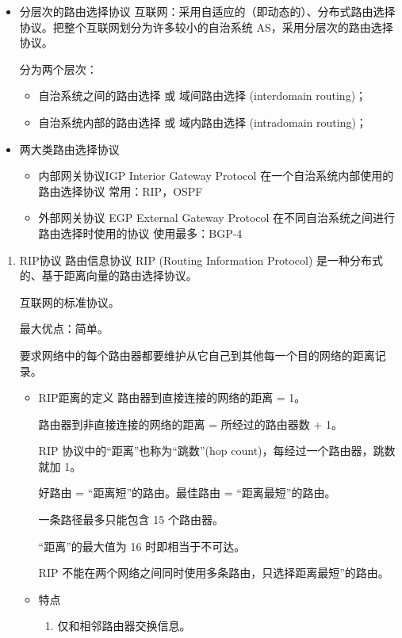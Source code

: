\documentclass[11pt]{article}
\begin{document}
\begin{enumerate}
\begin{itemize}
\item 分层次的路由选择协议
互联网：采用自适应的（即动态的）、分布式路由选择协议。把整个互联网划分为许多较小的自治系统 AS，采用分层次的路由选择协议。

分为两个层次：
\begin{itemize}
\item 自治系统之间的路由选择 或 域间路由选择 (interdomain routing)；

\item 自治系统内部的路由选择 或 域内路由选择 (intradomain routing)；
\end{itemize}

\item 两大类路由选择协议
\begin{itemize}
\item 内部网关协议IGP
Interior Gateway Protocol
在一个自治系统内部使用的路由选择协议
常用：RIP，OSPF
\item 外部网关协议 EGP
External Gateway Protocol
在不同自治系统之间进行路由选择时使用的协议
使用最多：BGP-4
\end{itemize}
\end{itemize}
\begin{enumerate}
\item RIP协议
\label{sec:org427fcf3}
路由信息协议 RIP (Routing Information Protocol) 是一种分布式的、基于距离向量的路由选择协议。

互联网的标准协议。

最大优点：简单。

要求网络中的每个路由器都要维护从它自己到其他每一个目的网络的距离记录。 

\begin{itemize}
\item RIP距离的定义
路由器到直接连接的网络的距离 = 1。

路由器到非直接连接的网络的距离 = 所经过的路由器数 + 1。

RIP 协议中的“距离”也称为“跳数”(hop count)，每经过一个路由器，跳数就加 1。

好路由 = “距离短”的路由。最佳路由 = “距离最短”的路由。

一条路径最多只能包含 15 个路由器。

“距离”的最大值为 16 时即相当于不可达。

RIP 不能在两个网络之间同时使用多条路由，只选择距离最短”的路由。
\item 特点
\begin{enumerate}
\item 仅和相邻路由器交换信息。


\end{enumerate}
\end{itemize}
\end{enumerate}
\end{enumerate}
\end{document}
